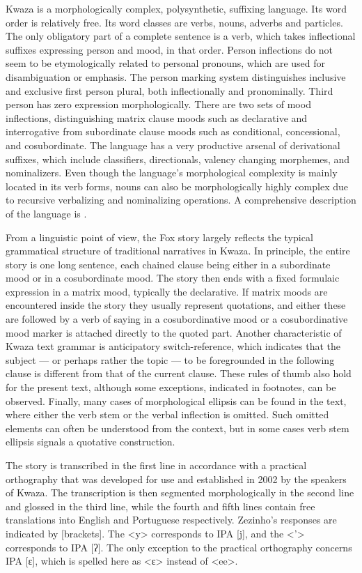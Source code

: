\documentclass[output=paper,
modfonts,nonflat
]{langsci/langscibook}
\begin{document}
  Kwaza is a morphologically complex, polysynthetic, suffixing language. Its word order is relatively free. Its word classes are verbs, nouns, adverbs and particles. The only obligatory part of a complete sentence is a verb, which takes inflectional suffixes expressing person and mood, in that order. Person inflections do not seem to be etymologically related to personal pronouns, which are used for disambiguation or emphasis. The person marking system distinguishes inclusive and exclusive first person plural, both inflectionally and pronominally. Third person has zero expression morphologically. There are two sets of mood inflections, distinguishing matrix clause moods such as declarative and interrogative from subordinate clause moods such as conditional, concessional, and cosubordinate. The language has a very productive arsenal of derivational suffixes, which include classifiers, directionals, valency changing morphemes, and nominalizers. Even though the language's morphological complexity is mainly located in its verb forms, nouns can also be morphologically highly complex due to recursive verbalizing  and nominalizing  operations. A comprehensive description of the language is \citet{g:vanderVoort:Kwaza}.

  \largerpage
  From a linguistic point of view, the Fox story largely reflects the typical grammatical structure of traditional narratives in Kwaza. In principle, the entire story is one long sentence, each chained clause being either in a subordinate mood or in a cosubordinate mood. The story then ends with a fixed formulaic expression in a matrix mood, typically the declarative. If matrix moods are encountered inside the story they usually represent quotations, and either these are followed by a verb of saying in a cosubordinative mood or a cosubordinative mood marker is attached directly to the quoted part. Another characteristic of Kwaza text grammar is anticipatory switch-reference, which indicates that the subject — or perhaps rather the topic — to be foregrounded in the following clause is different from that of the current clause. These rules of thumb also hold for the present text, although some exceptions, indicated in footnotes, can be observed. Finally, many cases of morphological ellipsis can be found in the text, where either the verb stem or the verbal inflection is omitted. Such omitted elements can often be understood from the context, but in some cases verb stem ellipsis signals a quotative construction. 

  The story is transcribed in the first line in accordance with a practical orthography that was developed for use and established in 2002 by the speakers of Kwaza. The transcription is then segmented morphologically in the second line and glossed in the third line, while the fourth and fifth lines contain free translations into English and Portuguese respectively. Zezinho’s responses are indicated by [brackets]. The <y> corresponds to IPA [j], and the <'> corresponds to IPA [ʔ]. The only exception to the practical orthography concerns IPA [ɛ], which is spelled here as <ɛ> instead of <ee>.
\end{document}

